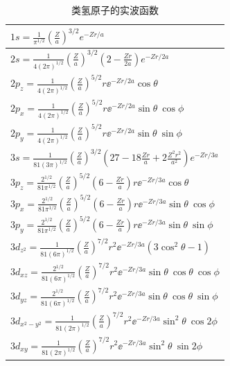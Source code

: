     \begin{table}[htbp]
        \centering
        \caption{类氢原子的实波函数}
        \label{tab:6.2}
        \renewcommand{\arraystretch}{1.5}
        \begin{tabular}{l}
            \hline
            $1s = \frac{1}{\pi^{1/2}}\left(\frac{Z}{a}\right)^{3/2}e^{-Zr/a}$ \\[0.5ex]
            \hline
            $2s = \frac{1}{4\left(2\pi\right)^{1/2}}\left(\frac{Z}{a}\right)^{3/2}\left(2 - \frac{Zr}{2a}\right)e^{-Zr/2a}$ \\[0.5ex]
            \hline
            $2p_z = \frac{1}{4\left(2\pi\right)^{1/2}}\left(\frac{Z}{a}\right)^{5/2}r\ee ^{-Zr/2a}\cos\theta$ \\[0.5ex]
            \hline
            $2p_x = \frac{1}{4\left(2\pi\right)^{1/2}}\left(\frac{Z}{a}\right)^{5/2}r\ee ^{-Zr/2a}\sin\theta\:\cos\phi$ \\[0.5ex]
            \hline
            $2p_y = \frac{1}{4\left(2\pi\right)^{1/2}}\left(\frac{Z}{a}\right)^{5/2}r\ee ^{-Zr/2a}\sin\theta\:\sin\phi$ \\[0.5ex]
            \hline
            $3s = \frac{1}{81\left(3\pi\right)^{1/2}}\left(\frac{Z}{a}\right)^{3/2}\left(27 - 18\frac{Zr}{a} + 2\frac{Z^2r^2}{a^2}\right)e^{-Zr/3a}$ \\[0.5ex]
            \hline
            $3p_z = \frac{2^{1/2}}{81\pi^{1/2}}\left(\frac{Z}{a}\right)^{5/2}\left(6 - \frac{Zr}{a}\right)r\ee ^{-Zr/3a}\cos\theta$ \\[0.5ex]
            \hline
            $3p_x = \frac{2^{1/2}}{81\pi^{1/2}}\left(\frac{Z}{a}\right)^{5/2}\left(6 - \frac{Zr}{a}\right)r\ee ^{-Zr/3a}\sin\theta\:\cos\phi$ \\[0.5ex]
            \hline
            $3p_y = \frac{2^{1/2}}{81\pi^{1/2}}\left(\frac{Z}{a}\right)^{5/2}\left(6 - \frac{Zr}{a}\right)r\ee ^{-Zr/3a}\sin\theta\:\sin\phi$ \\[0.5ex]
            \hline
            $3d_{z^2} = \frac{1}{81\left(6\pi\right)^{1/2}}\left(\frac{Z}{a}\right)^{7/2}r^2\ee ^{-Zr/3a}\left(3\cos^2\theta - 1\right)$ \\[0.5ex]
            \hline
            $3d_{xz} = \frac{2^{1/2}}{81\left(6\pi\right)^{1/2}}\left(\frac{Z}{a}\right)^{7/2}r^2\ee ^{-Zr/3a}\sin\theta\:\cos\theta\:\cos\phi$ \\[0.5ex]
            \hline
            $3d_{yz} = \frac{2^{1/2}}{81\left(6\pi\right)^{1/2}}\left(\frac{Z}{a}\right)^{7/2}r^2\ee ^{-Zr/3a}\sin\theta\:\cos\theta\:\sin\phi$ \\[0.5ex]
            \hline
            $3d_{x^2-y^2} = \frac{1}{81\left(2\pi\right)^{1/2}}\left(\frac{Z}{a}\right)^{7/2}r^2\ee ^{-Zr/3a}\sin^2\theta\:\cos2\phi$ \\[0.5ex]
            \hline
            $3d_{xy} = \frac{1}{81\left(2\pi\right)^{1/2}}\left(\frac{Z}{a}\right)^{7/2}r^2\ee ^{-Zr/3a}\sin^2\theta\:\sin2\phi$ \\[0.5ex]
        \end{tabular}
    \end{table}

